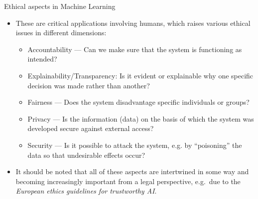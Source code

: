 \documentclass[11pt,compress,t,notes=noshow, xcolor=table]{beamer}
\begin{document}
\begin{vbframe}{Ethical aspects in Machine Learning}
%	
	\begin{itemize}
%		
		\item These are critical applications involving humans, which raises various ethical issues in different dimensions:
%		
		\begin{itemize}
			\item Accountability --- Can we make sure that the system is functioning as intended?
%			
			\item Explainability/Transparency: Is it evident or explainable why one specific decision was made rather than another?
%			
			\item Fairness --- Does the system disadvantage specific individuals or groups?
%			
			\item Privacy --- Is the information (data) on the basis of which the system was developed secure against external access?
%			
			\item Security --- Is it possible to attack the system, e.g. by ``poisoning'' the data so that undesirable effects occur?
		\end{itemize}
%	
	\item It should be noted that all of these aspects are intertwined in some way and becoming increasingly important from a legal perspective, e.g.\ due to the \emph{European ethics guidelines for trustworthy AI}.
%
	\end{itemize}
%
\end{vbframe}
\end{document}
